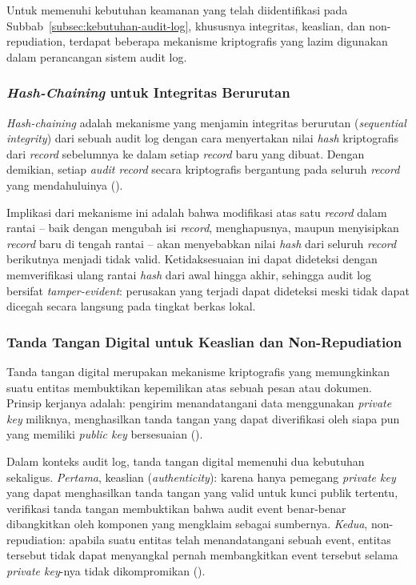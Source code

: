 Untuk memenuhi kebutuhan keamanan yang telah diidentifikasi pada
Subbab~\ref{subsec:kebutuhan-audit-log}, khususnya integritas,
keaslian, dan non-repudiation, terdapat beberapa mekanisme kriptografis
yang lazim digunakan dalam perancangan sistem audit log.

\subsubsection{\textit{Hash-Chaining} untuk Integritas Berurutan}

\textit{Hash-chaining} adalah mekanisme yang menjamin integritas
berurutan (\textit{sequential integrity}) dari sebuah audit log dengan
cara menyertakan nilai \textit{hash} kriptografis dari
\textit{record} sebelumnya ke dalam setiap \textit{record} baru yang
dibuat. Dengan demikian, setiap \textit{audit record} secara kriptografis
bergantung pada seluruh \textit{record} yang mendahuluinya
(\cite{nist80092}).

Implikasi dari mekanisme ini adalah bahwa modifikasi atas satu
\textit{record} dalam rantai -- baik dengan mengubah isi
\textit{record}, menghapusnya, maupun menyisipkan \textit{record}
baru di tengah rantai -- akan menyebabkan nilai \textit{hash} dari
seluruh \textit{record} berikutnya menjadi tidak valid. Ketidaksesuaian
ini dapat dideteksi dengan memverifikasi ulang rantai \textit{hash}
dari awal hingga akhir, sehingga audit log bersifat
\textit{tamper-evident}: perusakan yang terjadi dapat dideteksi meski
tidak dapat dicegah secara langsung pada tingkat berkas lokal.

\subsubsection{Tanda Tangan Digital untuk Keaslian dan Non-Repudiation}

Tanda tangan digital merupakan mekanisme kriptografis yang memungkinkan
suatu entitas membuktikan kepemilikan atas sebuah pesan atau dokumen.
Prinsip kerjanya adalah: pengirim menandatangani data menggunakan
\textit{private key} miliknya, menghasilkan tanda tangan yang dapat
diverifikasi oleh siapa pun yang memiliki \textit{public key}
bersesuaian (\cite{shostack2014}).

Dalam konteks audit log, tanda tangan digital memenuhi dua kebutuhan
sekaligus. \textit{Pertama}, keaslian (\textit{authenticity}): karena
hanya pemegang \textit{private key} yang dapat menghasilkan tanda
tangan yang valid untuk kunci publik tertentu, verifikasi tanda tangan
membuktikan bahwa audit event benar-benar dibangkitkan oleh komponen
yang mengklaim sebagai sumbernya. \textit{Kedua}, non-repudiation:
apabila suatu entitas telah menandatangani sebuah event, entitas
tersebut tidak dapat menyangkal pernah membangkitkan event tersebut
selama \textit{private key}-nya tidak dikompromikan
(\cite{shostack2014}).

